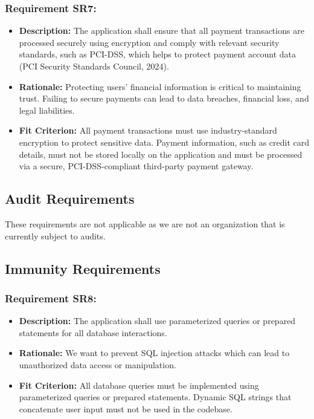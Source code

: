\documentclass[12pt]{article}
\begin{document}
\subsubsection*{Requirement SR7:}
\begin{itemize}
  \item \textbf{Description:} The application shall ensure that all payment transactions are processed securely using encryption and comply with relevant security standards, such as PCI-DSS, which helps to protect payment account data (PCI Security Standards Council, 2024).
  \item \textbf{Rationale:} Protecting users' financial information is critical to maintaining trust. Failing to secure payments can lead to data breaches, financial loss, and legal liabilities.
  \item \textbf{Fit Criterion:} All payment transactions must use industry-standard encryption to protect sensitive data. Payment information, such as credit card details, must not be stored locally on the application and must be processed via a secure, PCI-DSS-compliant third-party payment gateway.
\end{itemize}

\subsection{Audit Requirements}
These requirements are not applicable as we are not an organization that is currently subject to audits.
\subsection{Immunity Requirements}
\subsubsection*{Requirement SR8:}
\begin{itemize}
  \item \textbf{Description:} The application shall use parameterized queries or prepared statements for all database interactions.
  \item \textbf{Rationale:} We want to prevent SQL injection attacks which can lead to unauthorized data access or manipulation.
  \item \textbf{Fit Criterion:} All database queries must be implemented using parameterized queries or prepared statements. Dynamic SQL strings that concatenate user input must not be used in the codebase.
\end{itemize}
\end{document}
